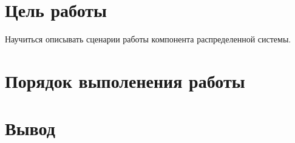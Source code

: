 	\section{Цель работы}
		Научиться описывать сценарии работы компонента распределенной системы.
	\section{Порядок выполенения работы}
	
	\section{Вывод}